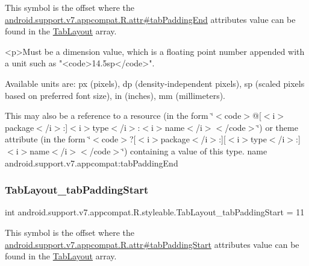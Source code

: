This symbol is the offset where the \hyperlink{classandroid_1_1support_1_1v7_1_1appcompat_1_1R_1_1attr_a1e0b501d6627fdcb2f6c08d3eb8efe01}{android.\+support.\+v7.\+appcompat.\+R.\+attr\#tab\+Padding\+End} attribute\textquotesingle{}s value can be found in the \hyperlink{classandroid_1_1support_1_1v7_1_1appcompat_1_1R_1_1styleable_a3c85d0c4cebbccf5b1a16ecfe13938ca}{Tab\+Layout} array.

\begin{DoxyVerb}      <p>Must be a dimension value, which is a floating point number appended with a unit such as "<code>14.5sp</code>".
\end{DoxyVerb}
 Available units are\+: px (pixels), dp (density-\/independent pixels), sp (scaled pixels based on preferred font size), in (inches), mm (millimeters). 

This may also be a reference to a resource (in the form \char`\"{}$<$code$>$@\mbox{[}$<$i$>$package$<$/i$>$\+:\mbox{]}$<$i$>$type$<$/i$>$\+:$<$i$>$name$<$/i$>$$<$/code$>$\char`\"{}) or theme attribute (in the form \char`\"{}$<$code$>$?\mbox{[}$<$i$>$package$<$/i$>$\+:\mbox{]}\mbox{[}$<$i$>$type$<$/i$>$\+:\mbox{]}$<$i$>$name$<$/i$>$$<$/code$>$\char`\"{}) containing a value of this type.  name android.\+support.\+v7.\+appcompat\+:tab\+Padding\+End \mbox{\label{classandroid_1_1support_1_1v7_1_1appcompat_1_1R_1_1styleable_a4035abeaff701951ad7db51385d68554}} 
\subsubsection{\texorpdfstring{Tab\+Layout\+\_\+tab\+Padding\+Start}{TabLayout\_tabPaddingStart}}
{\footnotesize\ttfamily int android.\+support.\+v7.\+appcompat.\+R.\+styleable.\+Tab\+Layout\+\_\+tab\+Padding\+Start = 11\hspace{0.3cm}{\ttfamily [static]}}

This symbol is the offset where the \hyperlink{classandroid_1_1support_1_1v7_1_1appcompat_1_1R_1_1attr_afb55623b8ecb6bc5f717ad08c4878c05}{android.\+support.\+v7.\+appcompat.\+R.\+attr\#tab\+Padding\+Start} attribute\textquotesingle{}s value can be found in the \hyperlink{classandroid_1_1support_1_1v7_1_1appcompat_1_1R_1_1styleable_a3c85d0c4cebbccf5b1a16ecfe13938ca}{Tab\+Layout} array.

